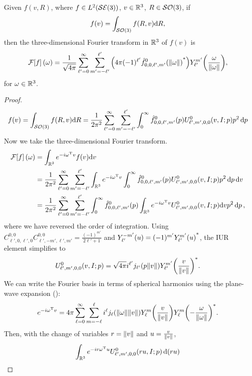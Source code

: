 \documentclass[../../main.tex]{subfiles}
\begin{document}
\begin{refsection}
	\begin{theorem}
		Given $f(v, R)$, where $f \in L^2(\mathcal{SE} (3))$, $v \in \mathbb{R}^3$, $R \in \mathcal{SO} (3)$, if
		$$f(v) = \int_{\mathcal{SO} (3)} f(R, v) \dd R,$$
		then the three-dimensional Fourier transform in $\mathbb{R}^3$ of $f(v)$ is
		$$\mathcal{F}\qty[f](\omega) = \frac{1}{\sqrt{4 \pi}} \sum_{\ell'=0}^\infty \sum_{m'=-\ell'}^{\ell'} \qty(4 \pi (-1)^{\ell'} {\hat{f}^0_{0,0,\ell',m'}(\norm{\omega})}^*) Y^{m'}_{\ell'}\qty(\frac{\omega}{\norm{\omega}}),$$
		for $\omega \in \mathbb{R}^3$.
	\end{theorem}
	\begin{proof}
		$$f(v) = \int_{\mathcal{SO} (3)} f(R, v) \dd R = \frac{1}{2 \pi^2} \sum_{\ell'=0}^\infty \sum_{m'=-\ell'}^{\ell'} \int_{0}^\infty \hat{f}^0_{0,0,\ell',m'}(p) U^0_{\ell',m',0,0}(v, I; p) p^2 \dd{p}$$
		Now we take the three-dimensional Fourier transform.
		\begin{align*}
			\mathcal{F}\qty[f](\omega)
			 & = \int_{\mathbb{R}^3} e^{-i {\omega}^\mathrm{T} v} f(v) \dd v                                                                                                                                                  \\
			 & = \frac{1}{2 \pi^2} \sum_{\ell'=0}^\infty \sum_{m'=-\ell'}^{\ell'} \int_{\mathbb{R}^3} e^{-i {\omega}^\mathrm{T} v} \int_{0}^\infty \hat{f}^0_{0,0,\ell',m'}(p) U^0_{\ell',m',0,0}(v, I; p) p^2 \dd{p} \dd v  \\
			 & = \frac{1}{2 \pi^2} \sum_{\ell'=0}^\infty \sum_{m'=-\ell'}^{\ell'} \int_{0}^\infty \hat{f}^0_{0,0,\ell',m'}(p) \int_{\mathbb{R}^3} e^{-i {\omega}^\mathrm{T} v} U^0_{\ell',m',0,0}(v, I; p) \dd v p^2 \dd{p},
		\end{align*}
		where we have reversed the order of integration.
		Using $C^{0,0}_{\ell',0,\ell',0} C^{0,0}_{\ell',-m',\ell',m'} = \frac{(-1)^{m'}}{2\ell' + 1}$ and $Y_{\ell'}^{-m'}(u) = (-1)^{m'} {Y_{\ell'}^{m'}(u)}^*$, the IUR element simplifies to
		$$U^0_{\ell',m',0,0}(v, I; p) = \sqrt{4\pi} i^{\ell'} j_{\ell'} (p \norm{v}) {Y^{m'}_{\ell'} \qty( \frac{v}{\norm{v}} )}^*.$$
		We can write the Fourier basis in terms of spherical harmonics using the plane-wave expansion (\cite[Eq. 4.43]{chirikjianHarmonicAnalysisEngineers2016}):
		$$e^{-i {\omega}^\mathrm{T} v} = 4\pi \sum_{\ell=0}^\infty \sum_{m=-\ell}^\ell i^\ell j_\ell(\norm{\omega} \norm{v}) Y^{m}_\ell \qty( \frac{v}{\norm{v}} ) {Y^{m}_\ell \qty(-\frac{\omega}{\norm{\omega}} )}^*.$$
		Then, with the change of variables $r = \norm{v}$ and $u = \frac{v}{\norm{v}}$,
		\begin{multline*}
			\int_{\bbR^3} e^{-\im r \trans{\omega} u} U^0_{\ell',m',0,0}(r u, I; p) \dd(r u) \\

\end{multline*}
\end{proof}
\end{refsection}
\end{document}

